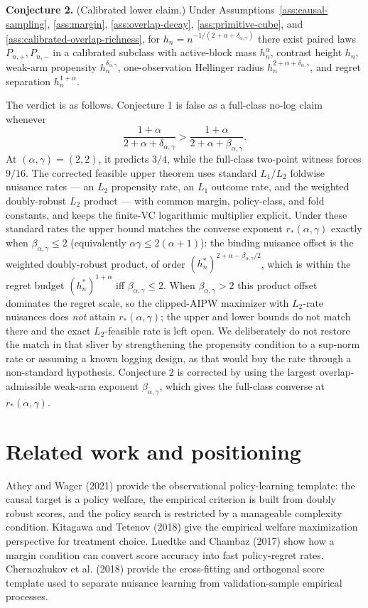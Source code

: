 \documentclass[11pt]{article}
\theoremstyle{definition}
\theoremstyle{plain}
\theoremstyle{remark}
\begin{document}
\textbf{Conjecture 2.} (Calibrated lower claim.) Under
Assumptions~\ref{ass:causal-sampling}, \ref{ass:margin},
\ref{ass:overlap-decay}, \ref{ass:primitive-cube}, and
\ref{ass:calibrated-overlap-richness}, for
\(h_n=n^{-1/(2+\alpha+\delta_{\alpha,\gamma})}\) there exist paired laws
\(P_{n,+},P_{n,-}\) in a calibrated subclass with active-block mass
\(h_n^\alpha\), contrast height \(h_n\), weak-arm propensity
\(h_n^{\delta_{\alpha,\gamma}}\), one-observation Hellinger radius
\(h_n^{2+\alpha+\delta_{\alpha,\gamma}}\), and regret separation
\(h_n^{1+\alpha}\).

The verdict is as follows.  Conjecture 1 is false as a full-class no-log
claim whenever
\[
\frac{1+\alpha}{2+\alpha+\delta_{\alpha,\gamma}}
>
\frac{1+\alpha}{2+\alpha+\beta_{\alpha,\gamma}}.
\]
At \((\alpha,\gamma)=(2,2)\), it predicts \(3/4\), while the full-class
two-point witness forces \(9/16\).  The corrected feasible upper theorem uses
standard \(L_1/L_2\) foldwise nuisance rates --- an \(L_2\) propensity rate,
an \(L_1\) outcome rate, and the weighted doubly-robust \(L_2\) product ---
with common margin, policy-class, and fold constants, and keeps the finite-VC
logarithmic multiplier explicit.  Under these standard rates the upper bound
matches the converse exponent \(r_*(\alpha,\gamma)\) exactly when
\(\beta_{\alpha,\gamma}\le2\) (equivalently \(\alpha\gamma\le2(\alpha+1)\)):
the binding nuisance offset is the weighted doubly-robust product, of order
\((h_n^*)^{2+\alpha-\beta_{\alpha,\gamma}/2}\), which is within the regret
budget \((h_n^*)^{1+\alpha}\) iff \(\beta_{\alpha,\gamma}\le2\).  When
\(\beta_{\alpha,\gamma}>2\) this product offset dominates the regret scale, so
the clipped-AIPW maximizer with \(L_2\)-rate nuisances does \emph{not} attain
\(r_*(\alpha,\gamma)\); the upper and lower bounds do not match there and the
exact \(L_2\)-feasible rate is left open.  We deliberately do not restore the
match in that sliver by strengthening the propensity condition to a sup-norm
rate or assuming a known logging design, as that would buy the rate through a
non-standard hypothesis.  Conjecture 2 is corrected by using the largest
overlap-admissible weak-arm exponent \(\beta_{\alpha,\gamma}\), which gives the
full-class converse at \(r_*(\alpha,\gamma)\).

\section{Related work and positioning}
Athey and Wager (2021) provide the observational policy-learning template:
the causal target is a policy welfare, the empirical criterion is built from
doubly robust scores, and the policy search is restricted by a manageable
complexity condition.  Kitagawa and Tetenov (2018) give the empirical welfare
maximization perspective for treatment choice.  Luedtke and Chambaz (2017)
show how a margin condition can convert score accuracy into fast policy-regret
rates.  Chernozhukov et al. (2018) provide the cross-fitting and orthogonal
score template used to separate nuisance learning from validation-sample
empirical processes.
\end{document}
